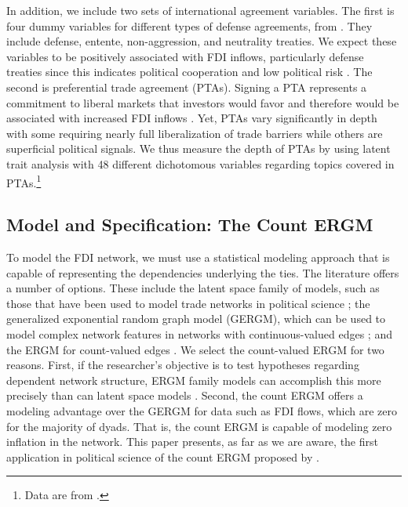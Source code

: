\documentclass{article}
\begin{document}
In addition, we include two sets of international agreement variables. The first is four dummy variables for different types of defense agreements, from \citet{Gibler09}. They include defense, entente, non-aggression, and neutrality treaties. We expect these variables to be positively associated with FDI inflows, particularly defense treaties since this indicates political cooperation and low political risk \citep{Li_Vashchilko:2010}. The second is preferential trade agreement (PTAs). Signing a PTA represents a commitment to liberal markets that investors would favor and therefore would be associated with increased FDI inflows \citep{Buthe_Milner:2008,buthe2014foreign}. Yet, PTAs vary significantly in depth with some requiring nearly full liberalization of trade barriers while others are superficial political signals. We thus measure the depth of PTAs by using latent trait analysis with 48 different dichotomous variables regarding topics covered in PTAs.\footnote{Data are from \citet{dur2014design}.}

\subsection{Model and Specification: The Count ERGM}

To model the FDI network, we must use a statistical modeling approach that is capable of representing the dependencies underlying the ties. The literature offers a number of options. These include the latent space family of models, such as those that have been used to model trade networks in political science \citep{ward2007persistent,ward2013gravity}; the generalized exponential random graph model (GERGM), which can be used to model complex network features in networks with continuous-valued edges \citep{desmarais2012statistical,wilson2017stochastic}; and the ERGM for count-valued edges \citep{krivitsky2012exponential}. We select the count-valued ERGM for two reasons. First, if the researcher's objective is to test hypotheses regarding dependent network structure, ERGM family models can accomplish this more precisely than can latent space models \citep{cranmer2016navigating,cranmer2016critique,desmarais2017statistical}. Second, the count ERGM offers a modeling advantage over the GERGM for data such as FDI flows, which are zero for the majority of dyads. That is, the count ERGM is capable of modeling zero inflation in the network. This paper presents, as far as we are aware, the first application in political science of the count ERGM proposed by \cite{krivitsky2012exponential}.
\end{document}
